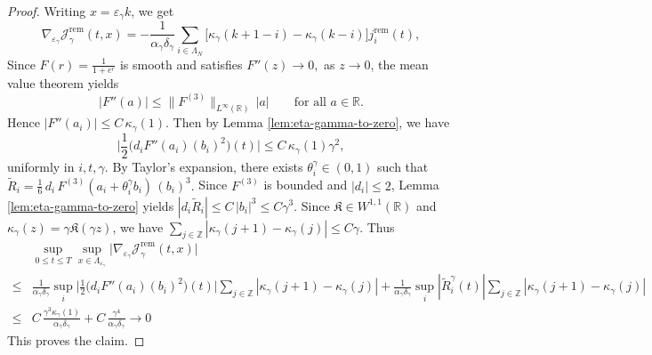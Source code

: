 \documentclass{article}
\begin{document}
\begin{proof}
Writing \(x=\varepsilon_\gamma k\), we get
\[
 \nabla_{\varepsilon_\gamma}\mathcal J_\gamma^{\mathrm{rem}}(t,x)
=
-\frac{1}{\alpha_\gamma\delta_\gamma}
\sum_{i\in\Lambda_N}
\bigl[\kappa_\gamma(k+1-i)-\kappa_\gamma(k-i)\bigr]
j_i^{\mathrm{rem}}(t),
\]
Since
\(
F(r)=\frac{1}{1+e^r}
\)
is smooth and satisfies
\(
F''(z) \to 0,
\) as $z \to 0$,
the mean value theorem yields
\[
|F''(a)|\le \|F^{(3)}\|_{L^\infty(\mathbb R)}\,|a|
\qquad\text{for all }a\in\mathbb R.
\]
Hence
\(
|F''(a_i)|\le C\,\kappa_\gamma(1).
\)
Then by Lemma \ref{lem:eta-gamma-to-zero}, we have
\[
\big|\frac12\big(d_iF''(a_i)(b_i)^2\big)(t) \big|
\le C\,\kappa_\gamma(1) \gamma ^2,
\]
uniformly in \(i,t,\gamma\).
By Taylor's expansion, there exists \(\theta_i^\gamma\in(0,1)\) such that
\(
\widetilde R_i = \frac16\,d_i\,F^{(3)}(a_i+\theta_i^\gamma b_i)\,(b_i)^3.
\)
Since \(F^{(3)}\) is bounded and \(|d_i|\le2\), Lemma \ref{lem:eta-gamma-to-zero} yields
\(
|d_i \widetilde R_i|
\le
C\,|b_i|^3
\le
C\gamma^3.
\)
Since \(\mathfrak K\in W^{1,1}(\mathbb R)\) and \(\kappa_\gamma(z)= \gamma\mathfrak K(\gamma z)\),
we have
\(
\sum_{j\in\mathbb Z}
|\kappa_\gamma(j+1)-\kappa_\gamma(j)|
\le C\gamma.
\)
Thus 
\begin{align*}
    &\sup_{0\le t\le T}\sup_{x\in\Lambda_{\varepsilon_\gamma}}\bigl| \nabla_{\varepsilon_\gamma}\mathcal J_\gamma^{\mathrm{rem}}(t,x)\bigr| \\
\le & \frac{1}{\alpha_\gamma\delta_\gamma}
\sup_i \Big|\frac12\big(d_iF''(a_i)(b_i)^2\big)(t) \Big|
\sum_{j\in\mathbb Z}
|\kappa_\gamma(j+1)-\kappa_\gamma(j)| + \frac{1}{\alpha_\gamma\delta_\gamma}
\sup_i |\widetilde R_i^\gamma(t)|
\sum_{j\in\mathbb Z}
|\kappa_\gamma(j+1)-\kappa_\gamma(j)| \\
\le & C\,
\frac{\gamma^3\kappa_\gamma(1)}{\alpha_\gamma\delta_\gamma} + C\,
\frac{\gamma^4}{\alpha_\gamma\delta_\gamma} \to 0
\end{align*}
This proves the claim.
\end{proof}
\end{document}
